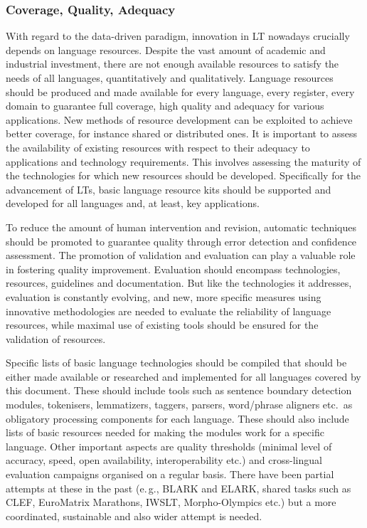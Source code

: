 \documentclass[10pt, plain]{../../metanetpaper}
\begin{document}
\begin{multicols}{2}
\subsubsection{Coverage, Quality, Adequacy}
\label{sec:cover-qual-adeq}

With regard to the data-driven paradigm, innovation in LT nowadays crucially depends on language resources. Despite the vast amount of academic and industrial investment, there are not enough available resources to satisfy the needs of all languages, quantitatively and qualitatively. Language resources should be produced and made available for every language, every register, every domain to guarantee full coverage, high quality and adequacy for various applications. New methods of resource development can be exploited to achieve better coverage, for instance shared or distributed ones. It is important to assess the availability of existing resources with respect to their adequacy to applications and technology requirements. This involves assessing the maturity of the technologies for which new resources should be developed. Specifically for the advancement of LTs, basic language resource kits should be supported and developed for all languages and, at least, key applications.

To reduce the amount of human intervention and revision, automatic techniques should be promoted to guarantee quality through error detection and confidence assessment. The promotion of validation and evaluation can play a valuable role in fostering quality improvement. Evaluation should encompass technologies, resources, guidelines and documentation. But like the technologies it addresses, evaluation is constantly evolving, and new, more specific measures using innovative methodologies are needed to evaluate the reliability of language resources, while maximal use of existing tools should be ensured for the validation of resources.

Specific lists of basic language technologies should be compiled that should be either made available or researched and implemented for all languages covered by this document. These should include tools such as sentence boundary detection modules, tokenisers, lemmatizers, taggers, parsers, word/phrase aligners etc.~as obligatory processing components for each language. These should also include lists of basic resources needed for making the modules work for a specific language. Other important aspects are quality thresholds (minimal level of accuracy, speed, open availability, interoperability etc.) and cross-lingual evaluation campaigns organised on a regular basis. There have been partial attempts at these in the past (e.\,g., BLARK and ELARK, shared tasks such as CLEF, EuroMatrix Marathons, IWSLT, Morpho-Olympics etc.) but a more coordinated, sustainable and also wider attempt is needed. 


\end{multicols}
\end{document}
